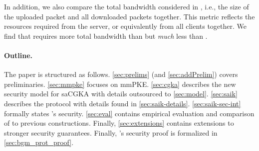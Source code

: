 In addition, we also compare the total bandwidth considered in \cite{hashimoto2021cmpke}, i.e., the size of the uploaded packet and all downloaded packets together. This metric reflects the resources required from the server, or equivalently from all clients together. We find that \saik requires more total bandwidth than \protCMPKE but \emph{much} less than \protITK.


%



\paragraph{Outline.}
The paper is structured as follows. \cref{sec:prelims}
(and \cref{sec:addPrelim}) covers preliminaries. \cref{sec:mmpke}
focuses on mmPKE. \cref{sec:cgka} describes the new security model for
saCGKA with details outsourced to \cref{sec:model}. \cref{sec:saik} describes the \saik protocol with details found in \cref{sec:saik-details}. \cref{sec:saik-sec-int} formally states \saik's security. \cref{sec:eval} contains empirical
evaluation and comparison of \saik to previous constructions. Finally, \cref{sec:extensions} contains extensions
to stronger security guarantees. Finally, \saik's security proof is formalized in \cref{sec:bgm_prot_proof}.



